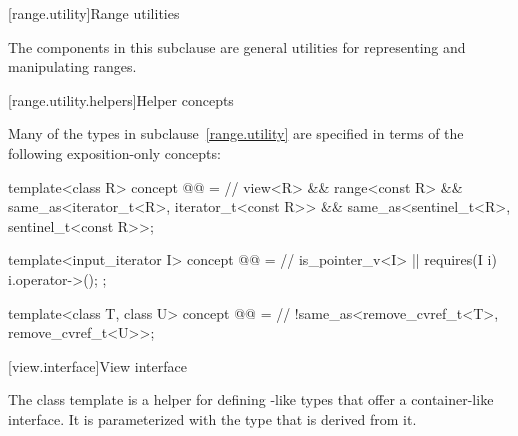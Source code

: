 [range.utility]{Range utilities}

\pnum
The components in this subclause are general utilities for representing and
manipulating ranges.

[range.utility.helpers]{Helper concepts}

\pnum
Many of the types in subclause~\ref{range.utility} are specified in terms of
the following exposition-only concepts:

\begin{codeblock}
template<class R>
  concept @@ =                         // \expos
    view<R> && range<const R> &&
    same_as<iterator_t<R>, iterator_t<const R>> &&
    same_as<sentinel_t<R>, sentinel_t<const R>>;

template<input_iterator I>
  concept @@ =                           // \expos
    is_pointer_v<I> || requires(I i) { i.operator->(); };

template<class T, class U>
  concept @@ =                         // \expos
    !same_as<remove_cvref_t<T>, remove_cvref_t<U>>;
\end{codeblock}

[view.interface]{View interface}

\pnum
The class template  is a helper for defining
-like types that offer a container-like interface. It is
parameterized with the type that is derived from it.

